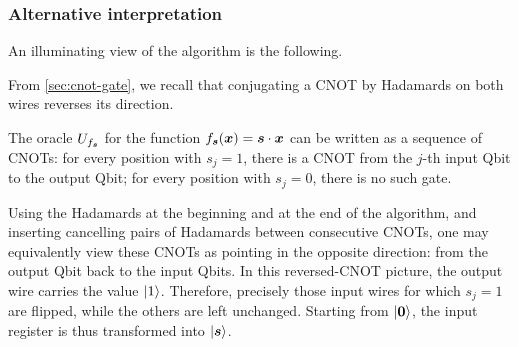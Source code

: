 \subsubsection*{Alternative interpretation}


An illuminating view of the algorithm is the following. %

From \autoref{sec:cnot-gate}, we recall that
conjugating a CNOT by Hadamards on both wires reverses its direction.

The oracle $U_{f_{{\boldsymbol{s}}}}$ for the function \(f_{{\boldsymbol{s}}}({\boldsymbol{x}})={\boldsymbol{s}}\cdot{\boldsymbol{x}}\) can be written as a sequence of CNOTs:
for every position with \(s_j=1\), there is a CNOT from the \(j\)-th input Qbit to the output Qbit;
for every position with \(s_j=0\), there is no such gate.

Using the Hadamards at the beginning and at the end of the algorithm,
and inserting cancelling pairs of Hadamards between consecutive CNOTs,
one may equivalently view these CNOTs as pointing in the opposite direction:
from the output Qbit back to the input Qbits.
In this reversed-CNOT picture, the output wire carries the value \(\ket{1}\).
Therefore, precisely those input wires for which \(s_j=1\) are flipped, while the others are left unchanged.
Starting from \(\ket{{\boldsymbol{0}}}\), the input register is thus transformed into \(\ket{{\boldsymbol{s}}}\).


